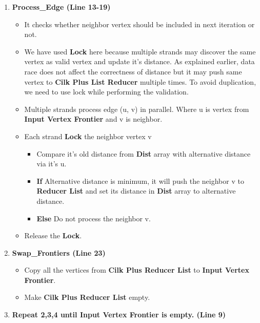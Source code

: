 \documentclass{article}
\begin{document}
\begin{enumerate}
\item \textbf{Process\_Edge (Line 13-19)}
\begin{itemize}
\item It checks whether neighbor vertex should be included in next iteration or not. \\
\item We have used \textbf{Lock} here because multiple strands may discover the same vertex as valid vertex and update it’s distance. As explained earlier, data race does not affect the correctness of distance but it may push same vertex to \textbf{Cilk Plus List Reducer} multiple times. To avoid duplication, we need to use lock while performing the validation. \\
\item Multiple strands process edge (u, v) in parallel. Where u is vertex from \textbf{Input Vertex Frontier} and v is neighbor. \\
\item Each strand \textbf{Lock} the neighbor vertex v 
\begin{itemize}
\item Compare it’s old distance from \textbf{Dist} array with alternative distance via it's u. \\
\item \textbf{If} Alternative distance is minimum, it will push the neighbor v to \textbf{Reducer List} and set its distance in \textbf{Dist} array to alternative distance. \\
\item \textbf{Else} Do not process the neighbor v. \\
\end{itemize}
\item Release the \textbf{Lock}.
\end{itemize}

\item \textbf{Swap\_Frontiers (Line 23)} \\
\begin{itemize}
\item Copy all the vertices from \textbf{Cilk Plus Reducer List} to \textbf{Input Vertex Frontier}.\\
\item Make \textbf{Cilk Plus Reducer List} empty. \\
\end{itemize}

\item \textbf{Repeat 2,3,4 until \textbf{Input Vertex Frontier} is empty. (Line 9)} \\


\end{enumerate}
\end{document}
